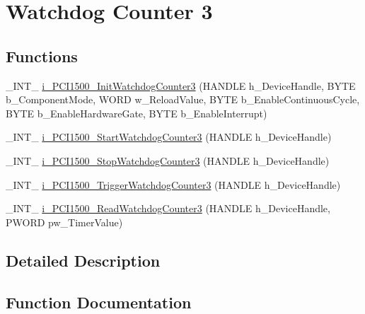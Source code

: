 \hypertarget{group___timer3}{}\section{Watchdog Counter 3}
\label{group___timer3}
\subsection*{Functions}
\begin{DoxyCompactItemize}
\item 
\+\_\+\+I\+N\+T\+\_\+ \mbox{\hyperlink{group___timer3_gaeaec06cb08c50bf127fa57187a8792a7}{i\+\_\+\+P\+C\+I1500\+\_\+\+Init\+Watchdog\+Counter3}} (H\+A\+N\+D\+LE h\+\_\+\+Device\+Handle, B\+Y\+TE b\+\_\+\+Component\+Mode, W\+O\+RD w\+\_\+\+Reload\+Value, B\+Y\+TE b\+\_\+\+Enable\+Continuous\+Cycle, B\+Y\+TE b\+\_\+\+Enable\+Hardware\+Gate, B\+Y\+TE b\+\_\+\+Enable\+Interrupt)
\item 
\+\_\+\+I\+N\+T\+\_\+ \mbox{\hyperlink{group___timer3_gac15800c549dcde632c88adade95042fc}{i\+\_\+\+P\+C\+I1500\+\_\+\+Start\+Watchdog\+Counter3}} (H\+A\+N\+D\+LE h\+\_\+\+Device\+Handle)
\item 
\+\_\+\+I\+N\+T\+\_\+ \mbox{\hyperlink{group___timer3_ga7731551ca4d73cf6e7ecce79bf2290f7}{i\+\_\+\+P\+C\+I1500\+\_\+\+Stop\+Watchdog\+Counter3}} (H\+A\+N\+D\+LE h\+\_\+\+Device\+Handle)
\item 
\+\_\+\+I\+N\+T\+\_\+ \mbox{\hyperlink{group___timer3_ga8a1123a07c58758552e2eacead5f8285}{i\+\_\+\+P\+C\+I1500\+\_\+\+Trigger\+Watchdog\+Counter3}} (H\+A\+N\+D\+LE h\+\_\+\+Device\+Handle)
\item 
\+\_\+\+I\+N\+T\+\_\+ \mbox{\hyperlink{group___timer3_ga5e6aec1589c8c085ffe0028f6bf01811}{i\+\_\+\+P\+C\+I1500\+\_\+\+Read\+Watchdog\+Counter3}} (H\+A\+N\+D\+LE h\+\_\+\+Device\+Handle, P\+W\+O\+RD pw\+\_\+\+Timer\+Value)
\end{DoxyCompactItemize}


\subsection{Detailed Description}


\subsection{Function Documentation}
\mbox{\label{group___timer3_gaeaec06cb08c50bf127fa57187a8792a7}} 
